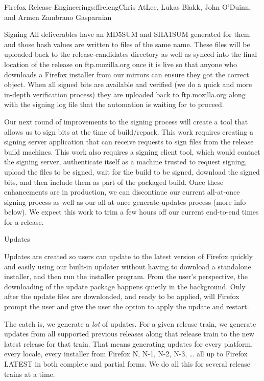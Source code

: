 \begin{aosachapter}{Firefox Release Engineering}{s:ffreleng}{Chris AtLee, Lukas Blakk, John O'Duinn, and Armen Zambrano Gasparnian}
\begin{aosasect1}{Signing}
All deliverables have an MD5SUM and SHA1SUM generated for them and
those hash values are written to files of the same name.  These files
will be uploaded back to the release-candidates directory as well as
synced into the final location of the release on ftp.mozilla.org once
it is live so that anyone who downloads a Firefox installer from our
mirrors can ensure they got the correct object. When all signed bits
are available and verified (we do a quick and more in-depth
verification process) they are uploaded back to ftp.mozilla.org along
with the signing log file that the automation is waiting for to
proceed.

Our next round of improvements to the signing process will create a
tool that allows us to sign bits at the time of build/repack. This
work requires creating a signing server application that can receive
requests to sign files from the release build machines. This work also
requires a signing client tool, which would contact the signing
server, authenticate itself as a machine trusted to request signing,
upload the files to be signed, wait for the build to be signed,
download the signed bits, and then include them as part of the
packaged build.  Once these enhancements are in production, we can
discontinue our current all-at-once signing process as well as our
all-at-once generate-updates process (more info below). We expect this
work to trim a few hours off our current end-to-end times for a
release.
  
\end{aosasect1}

\begin{aosasect1}{Updates}

Updates are created so users can update to the latest version of
Firefox quickly and easily using our built-in updater without having
to download a standalone installer, and then run the installer
program. From the user's perspective, the downloading of the update
package happens quietly in the background. Only after the update files
are downloaded, and ready to be applied, will Firefox prompt the user
and give the user the option to apply the update and restart.

The catch is, we generate a \emph{lot} of updates. For a given release
train, we generate updates from all supported previous releases along
that release train to the new latest release for that train.  That
means generating updates for every platform, every locale, every
installer from Firefox N, N-1, N-2, N-3, {\ldots} all up to Firefox
LATEST in both complete and partial forms. We do all this for several
release trains at a time.


\end{aosasect1}
\end{aosachapter}

